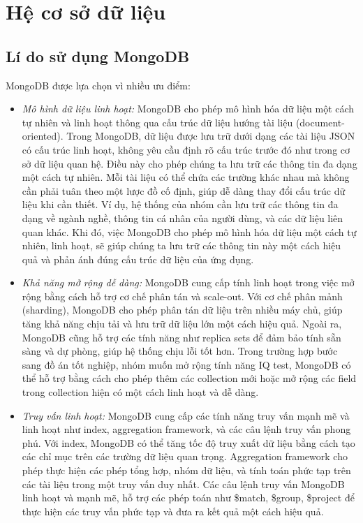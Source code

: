\section{Hệ cơ sở dữ liệu}
\subsection{Lí do sử dụng MongoDB}
MongoDB được lựa chọn vì nhiều ưu điểm:
\begin{itemize}
    \item \textit{Mô hình dữ liệu linh hoạt:} MongoDB cho phép mô hình hóa dữ liệu một cách tự nhiên và linh hoạt thông qua cấu trúc dữ liệu hướng tài liệu (document-oriented). Trong MongoDB, dữ liệu được lưu trữ dưới dạng các tài liệu JSON có cấu trúc linh hoạt, không yêu cầu định rõ cấu trúc trước đó như trong cơ sở dữ liệu quan hệ. Điều này cho phép chúng ta lưu trữ các thông tin đa dạng một cách tự nhiên. Mỗi tài liệu có thể chứa các trường khác nhau mà không cần phải tuân theo một lược đồ cố định, giúp dễ dàng thay đổi cấu trúc dữ liệu khi cần thiết. Ví dụ, hệ thống của nhóm cần lưu trữ các thông tin đa dạng về ngành nghề, thông tin cá nhân của người dùng, và các dữ liệu liên quan khác. Khi đó, việc MongoDB cho phép mô hình hóa dữ liệu một cách tự nhiên, linh hoạt, sẽ giúp chúng ta lưu trữ các thông tin này một cách hiệu quả và phản ánh đúng cấu trúc dữ liệu của ứng dụng.
    \item \textit{Khả năng mở rộng dễ dàng:} MongoDB cung cấp tính linh hoạt trong việc mở rộng bằng cách hỗ trợ cơ chế phân tán và scale-out. Với cơ chế phân mảnh (sharding), MongoDB cho phép phân tán dữ liệu trên nhiều máy chủ, giúp tăng khả năng chịu tải và lưu trữ dữ liệu lớn một cách hiệu quả. Ngoài ra, MongoDB cũng hỗ trợ các tính năng như replica sets để đảm bảo tính sẵn sàng và dự phòng, giúp hệ thống chịu lỗi tốt hơn. Trong trường hợp bước sang đồ án tốt nghiệp, nhóm muốn mở rộng tính năng IQ test, MongoDB có thể hỗ trợ bằng cách cho phép thêm các collection mới hoặc mở rộng các field trong collection hiện có một cách linh hoạt và dễ dàng.
    \item \textit{Truy vấn linh hoạt:} MongoDB cung cấp các tính năng truy vấn mạnh mẽ và linh hoạt như index, aggregation framework, và các câu lệnh truy vấn phong phú. Với index, MongoDB có thể tăng tốc độ truy xuất dữ liệu bằng cách tạo các chỉ mục trên các trường dữ liệu quan trọng. Aggregation framework cho phép thực hiện các phép tổng hợp, nhóm dữ liệu, và tính toán phức tạp trên các tài liệu trong một truy vấn duy nhất. Các câu lệnh truy vấn MongoDB linh hoạt và mạnh mẽ, hỗ trợ các phép toán như \$match, \$group, \$project để thực hiện các truy vấn phức tạp và đưa ra kết quả một cách hiệu quả.
\end{itemize}
